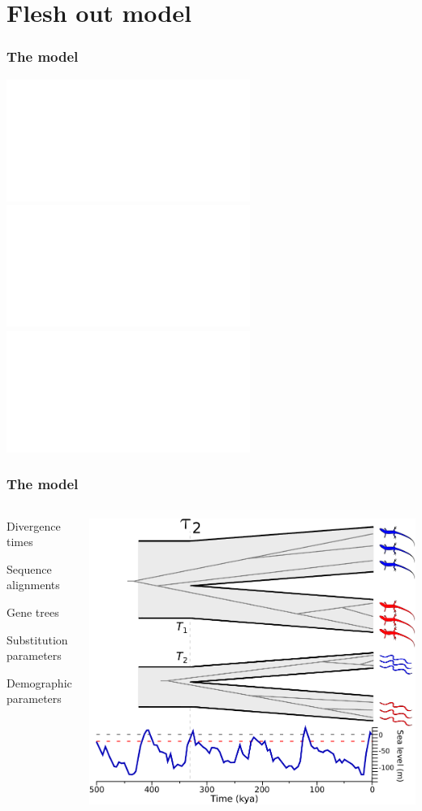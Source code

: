 \section{Flesh out model}
\begin{frame}
    \frametitle{The \msb model}
    \centerline{
        \includegraphics<1>[width=\textwidth]{../images/sea-level-prediction-trees-labels.pdf}
        \includegraphics<2>[width=\textwidth]{../images/sea-level-species-trees-islands.pdf}
        \includegraphics<3>[width=\textwidth]{../images/sea-level-species-trees-gene-trees-islands.pdf}
    }
\end{frame}

\begin{frame}
    \frametitle{The \msb model}
    \begin{columns}[c]
            \begin{mydescription}
                \item<2->[\divTimeMapVector] Divergence times
                \item<2->[\alignmentVector] Sequence alignments
                \item<2->[\geneTreeVector] Gene trees
                \item<2->[\hkyModelVector] Substitution parameters
                \item<2->[\demographicParamVector] Demographic parameters
            \end{mydescription}
            \includegraphics[width=\textwidth]{../images/sea-level-species-trees-gene-trees.pdf}
    \end{columns}
\end{frame}



